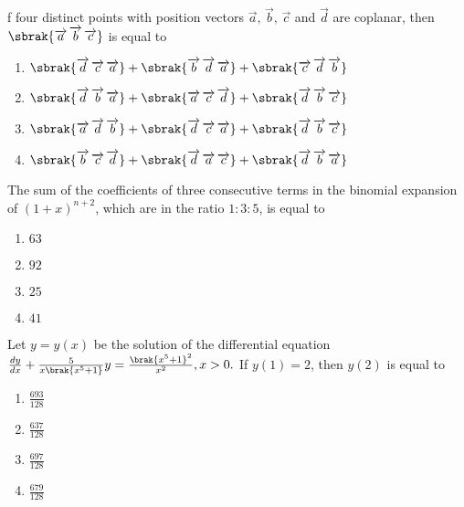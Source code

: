 \item f four distinct points with position vectors $\overrightarrow{a},\, \overrightarrow{b},\, \overrightarrow{c} $ and $\overrightarrow{d}$ are coplanar, then $\sbrak{\overrightarrow{a} \, \overrightarrow{b} \,\overrightarrow{c}}$ is equal to \hfill {}
\begin{multicols}{2}
\begin{enumerate}
    \item  $\sbrak{\overrightarrow{d} \, \overrightarrow{c} \, \overrightarrow{a}} + \sbrak{\overrightarrow{b} \, \overrightarrow{d} \, \overrightarrow{a}} + \sbrak{\overrightarrow{c} \, \overrightarrow{d} \, \overrightarrow{b}}$ 
    \item $\sbrak{\overrightarrow{d} \, \overrightarrow{b} \, \overrightarrow{a}} + \sbrak{\overrightarrow{a} \, \overrightarrow{c} \, \overrightarrow{d}} + \sbrak{\overrightarrow{d} \, \overrightarrow{b} \, \overrightarrow{c}}$
    \item $\sbrak{\overrightarrow{a} \, \overrightarrow{d} \, \overrightarrow{b}} + \sbrak{\overrightarrow{d} \, \overrightarrow{c} \, \overrightarrow{a}} + \sbrak{\overrightarrow{d} \, \overrightarrow{b} \, \overrightarrow{c}}$
    \item $\sbrak{\overrightarrow{b} \, \overrightarrow{c} \, \overrightarrow{d}} + \sbrak{\overrightarrow{d} \, \overrightarrow{a} \, \overrightarrow{c}} + \sbrak{\overrightarrow{d} \, \overrightarrow{b} \, \overrightarrow{a}}$
\end{enumerate}
\end{multicols}


\item The sum of the coefficients of three consecutive terms in the binomial expansion of $(1 + x)^{n+2}$, which are in the ratio $1 : 3 : 5$, is equal to \hfill {}
\begin{multicols}{4}
\begin{enumerate}
    \item $63$
    \item $92$
    \item $25$
    \item $41$
\end{enumerate}
\end{multicols}

\item Let $y = y(x)$ be the solution of the differential equation $\frac{dy}{dx} + \frac{5}{x\brak{x^5 + 1}}y = \frac{\brak{x^5 +1}^2}{x^2}, x > 0.$ If $y(1) = 2$, then $y(2)$ is equal to  \hfill {}
\begin{multicols}{4}
\begin{enumerate}
    \item $\frac{693}{128}$
    \item $\frac{637}{128}$
    \item $\frac{697}{128}$
    \item $\frac{679}{128}$
\end{enumerate}
\end{multicols}



